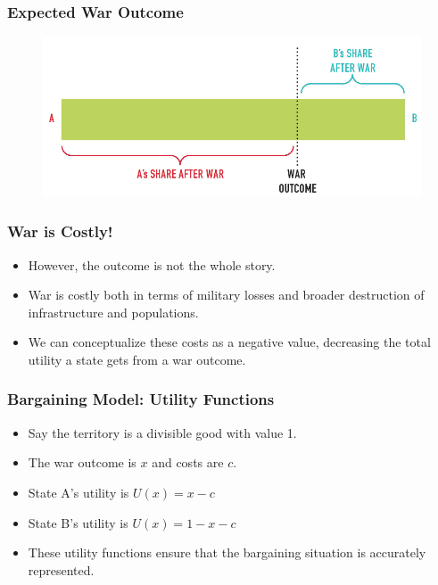 \documentclass{beamer}
\begin{document}
\begin{frame} 
\frametitle{\LARGE{Expected War Outcome}}
\begin{figure}[ht!]
	\centering
	\includegraphics[width=\textwidth,height=0.8\textheight,keepaspectratio]{./barg2.png}
\end{figure}
\end{frame}

\begin{frame} 
	\frametitle{\LARGE{War is Costly!}}
	\begin{itemize}
		\item However, the outcome is not the whole story. \pause
		\item War is costly both in terms of military losses and broader destruction of infrastructure and populations. \pause
		\item We can conceptualize these costs as a negative value, decreasing the total utility a state gets from a war outcome.
	\end{itemize}
\end{frame}

\begin{frame} 
	\frametitle{\LARGE{Bargaining Model: Utility Functions}}
	\begin{itemize}
		\item Say the territory is a divisible good with value 1. \pause
		\item The war outcome is $x$ and costs are $c$. \pause
		\item State A's utility is $U(x) = x -c$ \pause
		\item State B's utility is $U(x) = 1 - x -c$ \pause
		\item These utility functions ensure that the bargaining situation is accurately represented.
	\end{itemize}
\end{frame}
\end{document}
